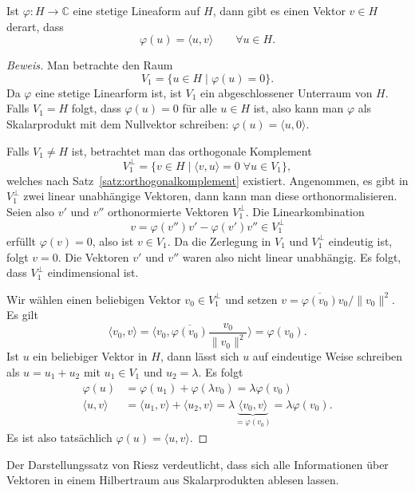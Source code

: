 \begin{satz}[Riesz]
Ist $\varphi\colon H\to \mathbb C$ eine stetige Lineaform auf $H$, dann 
gibt es einen Vektor $v\in H$ derart, dass
\[
\varphi(u) = \langle u,v\rangle
\qquad
\forall u\in H.
\]
\end{satz}

\begin{proof}[Beweis]
Man betrachte den Raum
\[
V_1 = \{ u \in H \;|\;\varphi(u)=0\}.
\]
Da $\varphi$ eine stetige Linearform ist, ist $V_1$ ein abgeschlossener
Unterraum von $H$.
Falls $V_1=H$ folgt, dass $\varphi(u)=0$ für alle $u\in H$ ist,
also kann man $\varphi$ als Skalarprodukt mit dem Nullvektor schreiben:
$\varphi(u) = \langle u,0\rangle$.

Falls $V_1 \ne H$ ist, betrachtet man das orthogonale Komplement
\[
V_1^{\perp} = \{ v\in H\;|\; \langle v,u\rangle = 0\; \forall u\in V_1\},
\]
welches nach Satz~\ref{satz:orthogonalkomplement} existiert.
Angenommen, es gibt in $V_1^\perp$ zwei linear unabhängige Vektoren,
dann kann man diese orthonormalisieren.
Seien also $v'$ und $v''$ orthonormierte Vektoren $V_1^\perp$.
Die Linearkombination
\[
v
=
\varphi(v'') v' - \varphi(v') v''
\in
V_1^\perp
\]
erfüllt $\varphi(v) = 0$, also ist $v\in V_1$.
Da die Zerlegung in $V_1$ und $V_1^\perp$ eindeutig ist, folgt
$v=0$.
Die Vektoren $v'$ und $v''$ waren also nicht linear unabhängig.
Es folgt, dass $V_1^\perp$ eindimensional ist.

Wir wählen einen beliebigen Vektor $v_0\in V_1^\perp$ und
setzen $v = \overline{\varphi(v_0)}v_0/\|v_0\|^2$.
Es gilt 
\[
\langle v_0,v\rangle
=
\biggl\langle v_0,
\overline{\varphi(v_0)}\frac{v_0}{\|v_0\|^2}
\biggr\rangle
=
\varphi(v_0).
\]
Ist $u$ ein beliebiger Vektor in $H$, dann lässt sich $u$ auf eindeutige
Weise schreiben als $u=u_1+u_2$ mit $u_1\in V_1$ und $u_2=\lambda $.
Es folgt
\begin{align*}
\varphi(u)
&=
\varphi(u_1) + \varphi(\lambda v_0)
=
\lambda \varphi(v_0)
\\
\langle u,v\rangle
&=
\langle u_1,v\rangle + \langle u_2,v\rangle
=
\lambda \underbrace{\langle v_0,v\rangle}_{\displaystyle=\varphi(v_0)}
=
\lambda \varphi(v_0).
\end{align*}
Es ist also tatsächlich $\varphi(u)=\langle u,v\rangle$.
\end{proof}

Der Darstellungssatz von Riesz verdeutlicht, dass sich alle Informationen über
Vektoren in einem Hilbertraum aus Skalarprodukten ablesen lassen.


